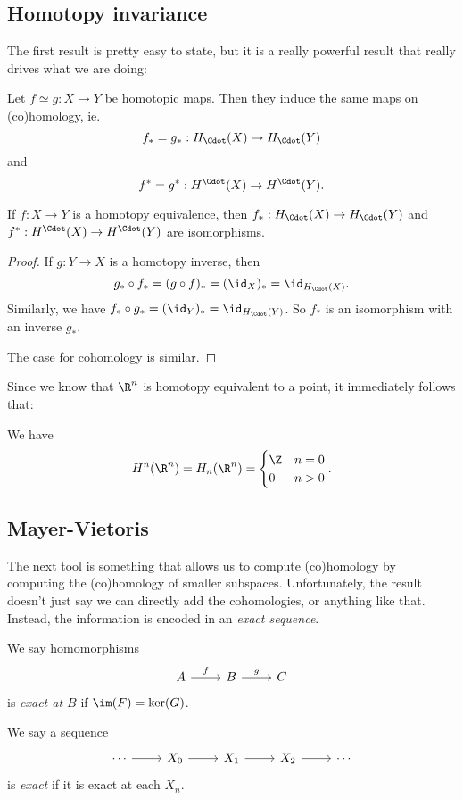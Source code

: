 \documentclass[a4paper]{article}
\theoremstyle{definition}
\begin{document}
\subsection{Homotopy invariance}
The first result is pretty easy to state, but it is a really powerful result that really drives what we are doing:

\begin{thm}
  Let $f \simeq g: X \to Y$ be homotopic maps. Then they induce the same maps on (co)homology, ie.
  \[
    f_* = g_*: H_\Cdot(X) \to H_\Cdot(Y)
  \]
  and
  \[
    f^* = g^* : H^\Cdot(X) \to H^\Cdot(Y).
  \]
\end{thm}

\begin{cor}
  If $f: X \to Y$ is a homotopy equivalence, then $f_*: H_{\Cdot}(X) \to H_{\Cdot}(Y)$ and $f^*: H^{\Cdot}(X) \to H^{\Cdot}(Y)$ are isomorphisms.
\end{cor}

\begin{proof}
  If $g: Y \to X$ is a homotopy inverse, then
  \[
    g_* \circ f_* = (g \circ f)_* = (\id_X)_* = \id_{H_{\Cdot}(X)}.
  \]
  Similarly, we have $f_* \circ g_* = (\id_Y)_* = \id_{H_{\Cdot}(Y)}$. So $f_*$ is an isomorphism with an inverse $g_*$.

  The case for cohomology is similar.
\end{proof}

Since we know that $\R^n$ is homotopy equivalent to a point, it immediately follows that:
\begin{eg}
  We have
  \[
    H^n(\R^n) = H_n(\R^n) =
    \begin{cases}
      \Z & n = 0\\
      0 & n > 0
    \end{cases}.
  \]
\end{eg}

\subsection{Mayer-Vietoris}
The next tool is something that allows us to compute (co)homology by computing the (co)homology of smaller subspaces. Unfortunately, the result doesn't just say we can directly add the cohomologies, or anything like that. Instead, the information is encoded in an \emph{exact sequence}.

\begin{defi}
  We say homomorphisms
  \[
    \begin{tikzcd}
      A \ar[r, "f"] & B \ar[r, "g"] & C
    \end{tikzcd}
  \]
  is \emph{exact at $B$} if $\im(F) = \ker(G)$.

  We say a sequence
  \[
    \begin{tikzcd}
      \cdots \ar[r] & X_0 \ar[r] & X_1 \ar[r] & X_2 \ar[r] & \cdots
    \end{tikzcd}
  \]
  is \emph{exact} if it is exact at each $X_n$.
\end{defi}
\end{document}
